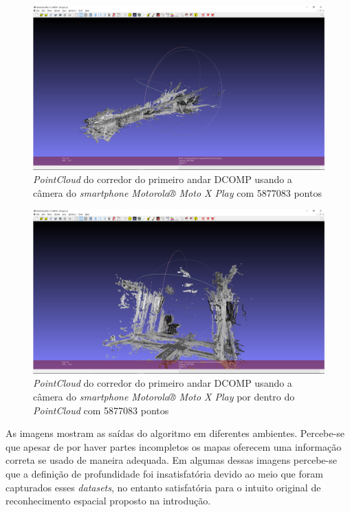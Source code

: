 \begin{figure}[H]
	\centering
		\includegraphics[width= \textwidth]{Imagens/corredorMotox.PNG}
	\caption{\textit{PointCloud} do corredor do primeiro andar DCOMP usando a câmera do \textit{smartphone Motorola® Moto X Play} com 5877083 pontos}
\end{figure}

\begin{figure}[H]
	\centering
		\includegraphics[width= \textwidth]{Imagens/corredorMotoxdentro.PNG}
	\caption{\textit{PointCloud} do corredor do primeiro andar DCOMP usando a câmera do \textit{smartphone Motorola® Moto X Play} por dentro do \textit{PointCloud} com 5877083 pontos}
\end{figure}

As imagens mostram as saídas do algoritmo em diferentes ambientes. Percebe-se que apesar de por haver partes incompletos os mapas oferecem uma informação correta se usado de maneira adequada. Em algumas dessas imagens percebe-se que a definição de profundidade foi insatisfatória devido ao meio que foram capturados esses \textit{datasets}, no entanto satisfatória para o intuito original de reconhecimento espacial proposto na introdução.

